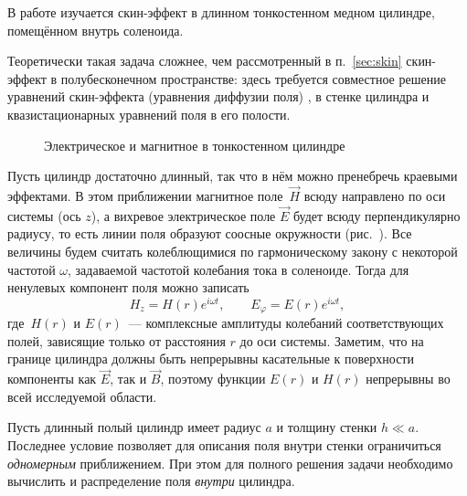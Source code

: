 


В работе изучается скин-эффект в длинном тонкостенном медном цилиндре, 
помещённом внутрь соленоида.

Теоретически такая задача сложнее,
чем рассмотренный в п.~\ref{sec:skin} скин-эффект в полубесконечном пространстве:
здесь требуется совместное решение уравнений
скин-эффекта (уравнения диффузии поля) ,
 в стенке цилиндра и квазистационарных 
уравнений поля в его полости.

\begin{wrapfigure}{o}{0.4\textwidth}
    \caption{Электрическое и магнитное в тонкостенном цилиндре}
\end{wrapfigure}
Пусть цилиндр достаточно длинный, так что в нём можно пренебречь
краевыми эффектами. 
В этом приближении магнитное поле~$\vec{H}$ всюду направлено
по оси системы (ось $z$), а вихревое электрическое поле $\vec{E}$ 
будет всюду перпендикулярно радиусу, то есть линии поля образуют соосные окружности
(рис.~).
Все величины будем считать колеблющимися по гармоническому закону 
с некоторой частотой $\omega$, задаваемой частотой колебания тока
в соленоиде. Тогда для ненулевых компонент поля можно записать
\[
H_z = H(r) e^{i\omega t},\qquad E_{\varphi} = E(r) e^{i\omega t},
\]
где~$H(r)$ и $E(r)$~--- комплексные амплитуды колебаний соответствующих полей, 
зависящие только от расстояния $r$ до оси системы.
Заметим, что на границе цилиндра должны быть непрерывны касательные
к поверхности компоненты как $\vec{E}$, так и $\vec{B}$, 
поэтому функции $E(r)$ и $H(r)$ непрерывны во всей исследуемой области.

Пусть длинный полый цилиндр имеет радиус $a$ и толщину стенки $h \ll a$. 
Последнее условие позволяет для описания поля внутри стенки
ограничиться \emph{одномерным} приближением. При этом для полного 
решения задачи необходимо вычислить и распределение поля \emph{внутри} цилиндра. 

